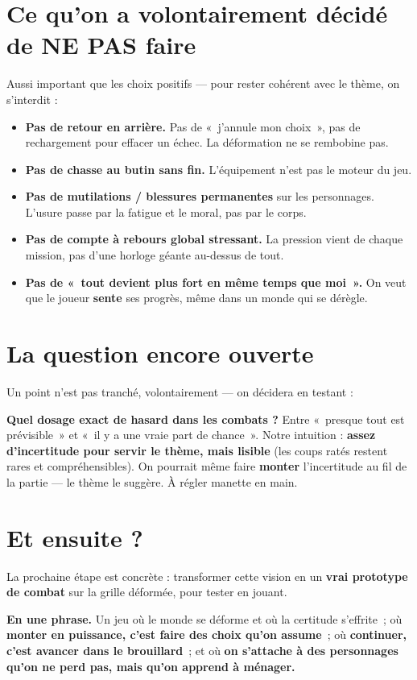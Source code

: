 \documentclass[11pt,a4paper]{article}
\begin{document}
\section{Ce qu'on a volontairement décidé de NE PAS faire}
\begin{nope}
Aussi important que les choix positifs --- pour rester cohérent avec le thème, on s'interdit :
\begin{itemize}
\item \textbf{Pas de retour en arrière.} Pas de «~j'annule mon choix~», pas de rechargement pour effacer un échec. La déformation ne se rembobine pas.
\item \textbf{Pas de chasse au butin sans fin.} L'équipement n'est pas le moteur du jeu.
\item \textbf{Pas de mutilations / blessures permanentes} sur les personnages. L'usure passe par la fatigue et le moral, pas par le corps.
\item \textbf{Pas de compte à rebours global stressant.} La pression vient de chaque mission, pas d'une horloge géante au-dessus de tout.
\item \textbf{Pas de «~tout devient plus fort en même temps que moi~».} On veut que le joueur \textbf{sente} ses progrès, même dans un monde qui se dérègle.
\end{itemize}
\end{nope}

\section{La question encore ouverte}
Un point n'est pas tranché, volontairement --- on décidera en testant :
\begin{ouvertbox}
\textbf{Quel dosage exact de hasard dans les combats ?} Entre «~presque tout est prévisible~» et «~il y a une vraie part de chance~». Notre intuition : \textbf{assez d'incertitude pour servir le thème, mais lisible} (les coups ratés restent rares et compréhensibles). On pourrait même faire \textbf{monter} l'incertitude au fil de la partie --- le thème le suggère. À régler manette en main.
\end{ouvertbox}

\section{Et ensuite ?}
La prochaine étape est concrète : transformer cette vision en un \textbf{vrai prototype de combat} sur la grille déformée, pour tester en jouant.

\begin{coeur}
\textbf{\color{ink}En une phrase.} Un jeu où le monde se déforme et où la certitude s'effrite~; où \textbf{monter en puissance, c'est faire des choix qu'on assume}~; où \textbf{continuer, c'est avancer dans le brouillard}~; et où \textbf{on s'attache à des personnages qu'on ne perd pas, mais qu'on apprend à ménager.}
\end{coeur}
\end{document}
